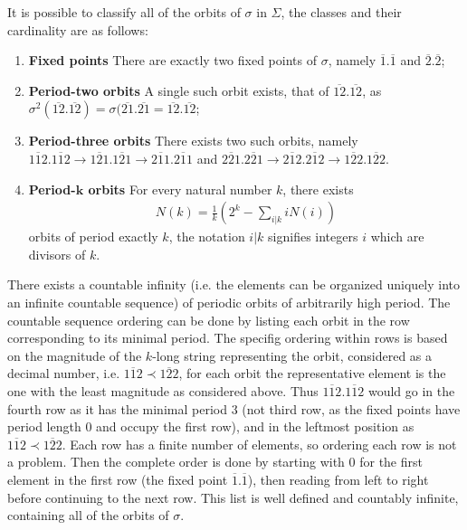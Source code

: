 It is possible to classify all of the orbits of $\sigma $ in $\Sigma$, the classes and their cardinality are as follows:
\begin{enumerate}
	\item \textbf{Fixed points} There are exactly two fixed points of $\sigma$, namely $\overline{1}\bm{.} \overline{1}$ and $\overline{2}\bm{.} \overline{2}$; 
	\item \textbf{Period-two orbits} A single such orbit exists, that of $\overline{12}\bm{.} \overline{12}$, as $\sigma^{2}(\overline{12}\bm{.} \overline{12}) = \sigma(\overline{21}\bm{.} \overline{21} = \overline{12}\bm{.} \overline{12}$;
	\item \textbf{Period-three orbits} There exists two such orbits, namely $\overline{112}\bm{.} \overline{112} \to \overline{121}\bm{.} \overline{121} \to \overline{211}\bm{.} \overline{211}$ and $\overline{221} \bm{.} \overline{221} \to \overline{212}\bm{.} \overline{212} \to \overline{122}\bm{.} \overline{122} $.
	\item \textbf{Period-$\bm{k} $ orbits} For every natural number $k$, there exists 
		\begin{align}
			\boxed{N(k) = \frac{1}{k}\left(2^k - \sum_{i | k }^{} i N(i)\right)}		
		\end{align}
	orbits of period exactly $k$, the notation $i|k$ signifies integers $i$ which are divisors of $k$.	
\end{enumerate}
There exists a countable infinity (i.e. the elements can be organized uniquely into an infinite countable sequence) of periodic orbits of arbitrarily high period. The countable sequence ordering can be done by listing each orbit in the row corresponding to its minimal period. The specifig ordering within rows is based on the magnitude of the $k$-long string representing the orbit, considered as a decimal number, i.e. $\overline{112}\prec \overline{122}$, for each orbit the representative element is the one with the least magnitude as considered above. Thus $\overline{112}\bm{.} \overline{112}$ would go in the fourth row as it has the minimal period $3$ (not third row, as the fixed points have period length $0$ and occupy the first row), and in the leftmost position as $\overline{112} \prec \overline{122}$. Each row has a finite number of elements, so ordering each row is not a problem. Then the complete order is done by starting with $0$ for the first element in the first row (the fixed point $\overline{1}\bm{.} \overline{1}$), then reading from left to right before continuing to the next row. This list is well defined and countably infinite, containing all of the orbits of $\sigma$.

